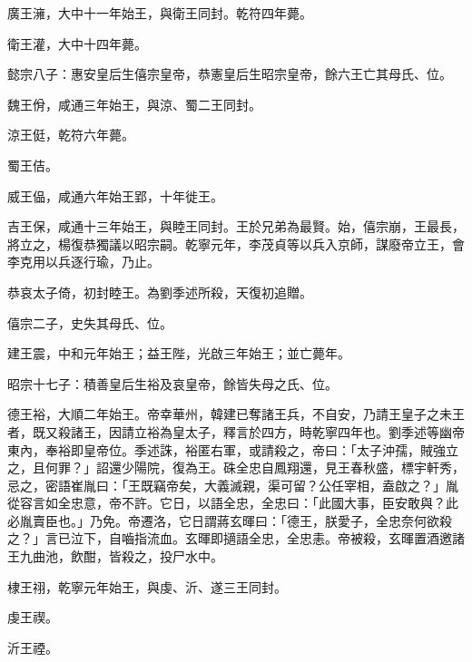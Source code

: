 \begin{pinyinscope}
 廣王澭，大中十一年始王，與衛王同封。乾符四年薨。



 衛王灌，大中十四年薨。



 懿宗八子：惠安皇后生僖宗皇帝，恭憲皇后生昭宗皇帝，餘六王亡其母氏、位。



 魏王佾，咸通三年始王，與涼、蜀二王同封。



 涼王侹，乾符六年薨。



 蜀王佶。



 威王偘，咸通六年始王郢，十年徙王。



 吉王保，咸通十三年始王，與睦王同封。王於兄弟為最賢。始，僖宗崩，王最長，將立之，楊復恭獨議以昭宗嗣。乾寧元年，李茂貞等以兵入京師，謀廢帝立王，會李克用以兵逐行瑜，乃止。



 恭哀太子倚，初封睦王。為劉季述所殺，天復初追贈。



 僖宗二子，史失其母氏、位。



 建王震，中和元年始王；益王陛，光啟三年始王；並亡薨年。



 昭宗十七子：積善皇后生裕及哀皇帝，餘皆失母之氏、位。



 德王裕，大順二年始王。帝幸華州，韓建已奪諸王兵，不自安，乃請王皇子之未王者，既又殺諸王，因請立裕為皇太子，釋言於四方，時乾寧四年也。劉季述等幽帝東內，奉裕即皇帝位。季述誅，裕匿右軍，或請殺之，帝曰：「太子沖孺，賊強立之，且何罪？」詔還少陽院，復為王。硃全忠自鳳翔還，見王春秋盛，標宇軒秀，忌之，密語崔胤曰：「王既竊帝矣，大義滅親，渠可留？公任宰相，盍啟之？」胤從容言如全忠意，帝不許。它日，以語全忠，全忠曰：「此國大事，臣安敢與？此必胤賣臣也。」乃免。帝遷洛，它日謂蔣玄暉曰：「德王，朕愛子，全忠奈何欲殺之？」言已泣下，自嚙指流血。玄暉即擿語全忠，全忠恚。帝被殺，玄暉置酒邀諸王九曲池，飲酣，皆殺之，投尸水中。



 棣王祤，乾寧元年始王，與虔、沂、遂三王同封。



 虔王禊。



 沂王禋。




\end{pinyinscope}
